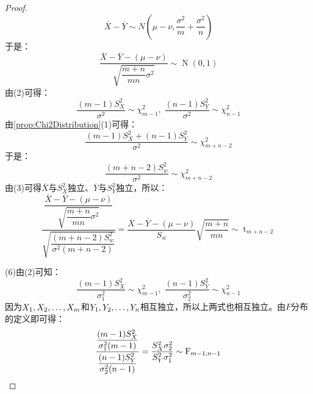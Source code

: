 \begin{proof}
	\begin{equation*}
		\overline{X}-\overline{Y}\sim N\left(\mu-\nu,\frac{\sigma^2}{m}+\frac{\sigma^2}{n}\right)
	\end{equation*}
	于是：
	\begin{equation*}
		\frac{\overline{X}-\overline{Y}-(\mu-\nu)}{\sqrt{\dfrac{m+n}{mn}\sigma^2}}\sim \operatorname{N}(0,1)
	\end{equation*}
	由(2)可得：
	\begin{equation*}
		\frac{(m-1)S_X^2}{\sigma^2}\sim\chi_{m-1}^2,\;
		\frac{(n-1)S_Y^2}{\sigma^2}\sim\chi_{n-1}^2
	\end{equation*}
	由\cref{prop:Chi2Distribution}(1)可得：
	\begin{equation*}
		\frac{(m-1)S_X^2+(n-1)S_Y^2}{\sigma^2}\sim\chi_{m+n-2}^2
	\end{equation*}
	于是：
	\begin{equation*}
		\frac{(m+n-2)S_w^2}{\sigma^2}\sim\chi_{m+n-2}^2
	\end{equation*}
	由(3)可得$\overline{X}$与$S_X^2$独立、$\overline{Y}$与$S_Y^2$独立，所以：
	\begin{equation*}
		\frac{\dfrac{\overline{X}-\overline{Y}-(\mu-\nu)}{\sqrt{\dfrac{m+n}{mn}\sigma^2}}}{\sqrt{\dfrac{(m+n-2)S_w^2}{\sigma^2(m+n-2)}}}=\frac{\overline{X}-\overline{Y}-(\mu-\nu)}{S_w}\sqrt{\dfrac{m+n}{mn}}\sim \operatorname{t}_{m+n-2}
	\end{equation*}\par
	(6)由(2)可知：
	\begin{equation*}
		\frac{(m-1)S_X^2}{\sigma_1^2}\sim\chi_{m-1}^2,\;
		\frac{(n-1)S_Y^2}{\sigma_2^2}\sim\chi_{n-1}^2
	\end{equation*}
	因为$X_1, X_2, \dots, X_{m}$和$Y_1, Y_2, \dots, Y_{n}$相互独立，所以上两式也相互独立。由$F$分布的定义即可得：
	\begin{equation*}
		\frac{\dfrac{(m-1)S_X^2}{\sigma_1^2(m-1)}}{\dfrac{(n-1)S_Y^2}{\sigma_2^2(n-1)}}=\frac{S_X^2\sigma_2^2}{S_Y^2\sigma_1^2}\sim \operatorname{F}_{m-1,n-1}\qedhere
	\end{equation*}
\end{proof}